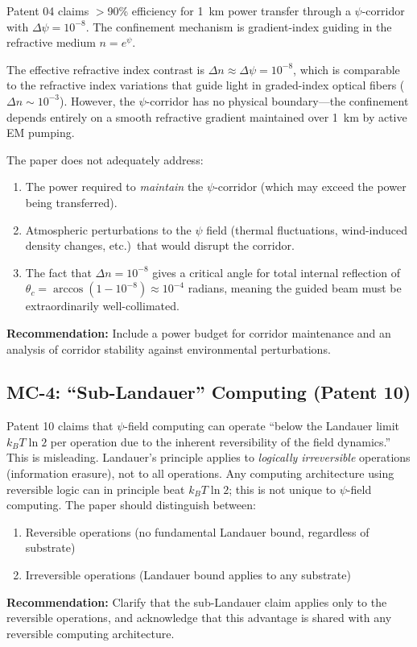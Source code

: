 \documentclass[12pt,a4paper]{article}
\begin{document}
\begin{moderate}
Patent 04 claims $>$90\% efficiency for 1~km power transfer through a
$\psi$-corridor with $\Delta\psi = 10^{-8}$. The confinement mechanism
is gradient-index guiding in the refractive medium $n = e^\psi$.

The effective refractive index contrast is $\Delta n \approx \Delta\psi
= 10^{-8}$, which is comparable to the refractive index variations that
guide light in graded-index optical fibers ($\Delta n \sim 10^{-3}$).
However, the $\psi$-corridor has no physical boundary---the confinement
depends entirely on a smooth refractive gradient maintained over 1~km by
active EM pumping.

The paper does not adequately address:
\begin{enumerate}[nosep]
\item The power required to \textit{maintain} the $\psi$-corridor
(which may exceed the power being transferred).
\item Atmospheric perturbations to the $\psi$ field (thermal fluctuations,
wind-induced density changes, etc.)\ that would disrupt the corridor.
\item The fact that $\Delta n = 10^{-8}$ gives a critical angle for total
internal reflection of $\theta_c = \arccos(1 - 10^{-8}) \approx 10^{-4}$
radians, meaning the guided beam must be extraordinarily well-collimated.
\end{enumerate}

\textbf{Recommendation:} Include a power budget for corridor maintenance and
an analysis of corridor stability against environmental perturbations.
\end{moderate}

\subsection{MC-4: ``Sub-Landauer'' Computing (Patent 10)}

\begin{moderate}
Patent 10 claims that $\psi$-field computing can operate ``below the
Landauer limit $k_BT\ln 2$ per operation due to the inherent reversibility
of the field dynamics.'' This is misleading. Landauer's principle applies
to \textit{logically irreversible} operations (information erasure), not
to all operations. Any computing architecture using reversible logic can
in principle beat $k_BT\ln 2$; this is not unique to $\psi$-field computing.
The paper should distinguish between:
\begin{enumerate}[nosep]
\item Reversible operations (no fundamental Landauer bound, regardless of substrate)
\item Irreversible operations (Landauer bound applies to any substrate)
\end{enumerate}
\textbf{Recommendation:} Clarify that the sub-Landauer claim applies only
to the reversible operations, and acknowledge that this advantage is shared
with any reversible computing architecture.
\end{moderate}
\end{document}
